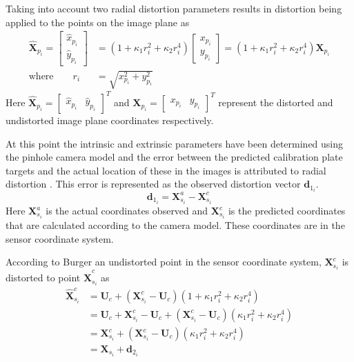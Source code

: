 \documentclass[12pt,oneside,openany,a4paper, %
english, %
masters-t, goldenblock]{usthesis}
\begin{document}
Taking into account two radial distortion parameters results in distortion being applied to the points on the image plane as
\begin{align}
  \hat{\bm{X}}_{p_i} =
  \begin{bmatrix}
  \hat{x}_{p_i} \\
  \hat{y}_{p_i}
  \end{bmatrix} &= \left(
  1 + \kappa_1 r_i^2 + \kappa_2 r_i^4 \right)
  \begin{bmatrix}
  x_{p_i} \\
  y_{p_i}
  \end{bmatrix} =
  \left(
    1 + \kappa_1 r_i^2 + \kappa_2 r_i^4 \right) \bm{X}_{p_i} \\
  \text{where} \quad \quad r_i &= \sqrt{x_{p_i}^2 + y_{p_i}^2}
  \label{eq: distortion radius}
\end{align}
Here $\hat{\bm{X}}_{p_i} = \begin{bmatrix} \hat{x}_{p_i} & \hat{y}_{p_i} \end{bmatrix} ^T$ and $\bm{X}_{p_i} = \begin{bmatrix} x_{p_i} & y_{p_i} \end{bmatrix} ^T$ represent the distorted and undistorted image plane coordinates respectively.

At this point the intrinsic and extrinsic parameters have been determined using the pinhole camera model and the error between the predicted calibration plate targets and the actual location of these in the images is attributed to radial distortion \cite{zhangtut}. This error is represented as the observed distortion vector $\bm{d}_{1_i}$.
\begin{equation}
  \bm{d}_{1_i} = \bm{X}_{s_i}^{a} - \bm{X}_{s_i}^{c}
\end{equation}
Here $\bm{X}_{s_i}^{a}$ is the actual coordinates observed and $\bm{X}_{s_i}^{c}$ is the predicted coordinates that are calculated according to the camera model. These coordinates are in the sensor coordinate system. 

According to Burger \cite{zhangtut} an undistorted point in the sensor coordinate system, $\bm{X}_{s_i}^c$ is distorted to point $\hat{\bm{X}}_{s_i}^c$ as
\begin{align}
  \hat{\bm{X}}_{s_i}^c &= \bm{U}_c + (\bm{X}_{s_i}^c-\bm{U}_c) (1 + \kappa_1 r_i^2 + \kappa_2 r_i^4) \\
  &= \bm{U}_c + \bm{X}_{s_i}^c - \bm{U}_c + (\bm{X}_{s_i}^c-\bm{U}_c) (\kappa_1 r_i^2 + \kappa_2 r_i^4) \\
  &= \bm{X}_{s_i}^c + (\bm{X}_{s_i}^c-\bm{U}_c) (\kappa_1 r_i^2 + \kappa_2 r_i^4) \\
  &= \bm{X}_{s_i} + \bm{d}_{2_i}
\end{align}
\end{document}
